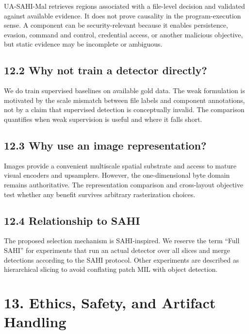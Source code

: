 \documentclass[
  10pt,
]{article}
\begin{document}
UA-SAHI-Mal retrieves regions associated with a file-level decision and
validated against available evidence. It does not prove causality in the
program-execution sense. A component can be security-relevant because it
enables persistence, evasion, command and control, credential access, or
another malicious objective, but static evidence may be incomplete or
ambiguous.

\subsection{12.2 Why not train a detector
directly?}\label{why-not-train-a-detector-directly}

We do train supervised baselines on available gold data. The weak
formulation is motivated by the scale mismatch between file labels and
component annotations, not by a claim that supervised detection is
conceptually invalid. The comparison quantifies when weak supervision is
useful and where it falls short.

\subsection{12.3 Why use an image
representation?}\label{why-use-an-image-representation}

Images provide a convenient multiscale spatial substrate and access to
mature visual encoders and upsamplers. However, the one-dimensional byte
domain remains authoritative. The representation comparison and
cross-layout objective test whether any benefit survives arbitrary
rasterization choices.

\subsection{12.4 Relationship to SAHI}\label{relationship-to-sahi}

The proposed selection mechanism is SAHI-inspired. We reserve the term
``Full SAHI'' for experiments that run an actual detector over all
slices and merge detections according to the SAHI protocol. Other
experiments are described as hierarchical slicing to avoid conflating
patch MIL with object detection.

\section{13. Ethics, Safety, and Artifact
Handling}\label{ethics-safety-and-artifact-handling}
\end{document}
